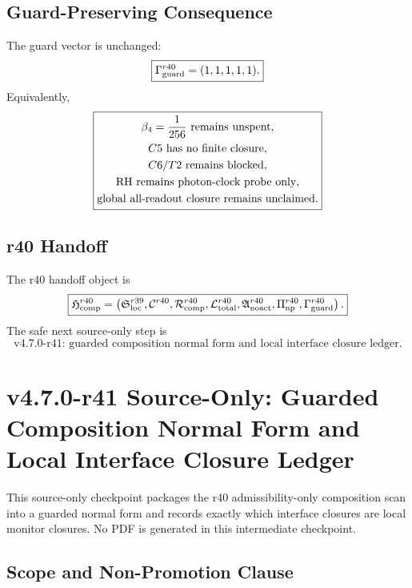 \subsection{Guard-Preserving Consequence}
\label{subsec:r40-guard-preserving-consequence}

The guard vector is unchanged:
\[
\boxed{
\Gamma_{\rm guard}^{r40}=(1,1,1,1,1).
}
\]
Equivalently,
\[
\boxed{
\begin{gathered}
\beta_4={1\over256}\hbox{ remains unspent},\\
C5\hbox{ has no finite closure},\\
C6/T2\hbox{ remains blocked},\\
\mathrm{RH}\hbox{ remains photon-clock probe only},\\
\hbox{global all-readout closure remains unclaimed}.
\end{gathered}
}
\]

\subsection{r40 Handoff}
\label{subsec:r40-handoff}

The r40 handoff object is
\[
\boxed{
\mathfrak H_{\rm comp}^{r40}
=
\left(
\mathfrak S_{\rm loc}^{r39},
\mathcal C^{r40},
\mathcal R_{\rm comp}^{r40},
\mathcal L_{\rm total}^{r40},
\mathfrak A_{\rm noact}^{r40},
\Pi_{\rm np}^{r40},
\Gamma_{\rm guard}^{r40}
\right).
}
\]
The safe next source-only step is
\[
\boxed{
\text{v4.7.0-r41: guarded composition normal form and local interface closure ledger.}
}
\]





\section{v4.7.0-r41 Source-Only: Guarded Composition Normal Form and Local Interface Closure Ledger}
\label{sec:v470-r41-guarded-composition-normal-form}

This source-only checkpoint packages the r40 admissibility-only composition scan
into a guarded normal form and records exactly which interface closures are local
monitor closures.  No PDF is generated in this intermediate checkpoint.

\subsection{Scope and Non-Promotion Clause}
\label{subsec:r41-scope-non-promotion-clause}

